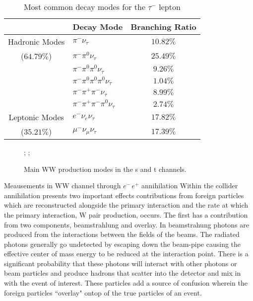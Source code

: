 \begin{table}
\centering
 \begin{tabular}{|c|l|c|} 
 
 \hline
       & Decay Mode & Branching Ratio  \\ \hline \hline
    Hadronic Modes  & $\pi^- \nu_\tau$  & $10.82\%$  \\
      	($64.79\%$) & $\pi^- \pi^0 \nu_\tau$ & $25.49\%$ \\
     				& $\pi^- \pi^0 \pi^0 \nu_\tau$  & $9.26\%$  \\
     				& $\pi^- \pi^0 \pi^0 \pi^0 \nu_\tau$  & $1.04\%$   \\
      				& $\pi^- \pi^+ \pi^- \nu_\tau$  & $8.99\%$      \\ 
      				& $\pi^- \pi^+ \pi^- \pi^0 \nu_\tau$  & $2.74\%$  \\ \hline
    			    
    Leptonic Modes  & $e^- \nu_e \nu_\tau$ & $17.82\%$   \\
    	($35.21\%$)	& $\mu^- \nu_\mu \nu_\tau $  & $17.39\%$      \\ \midrule \hline
      				
     				
\end{tabular}
        \caption{\label{tab:taudecay}Most common decay modes for the $\tau^-$ lepton \cite{pdg}}
\end{table}
       
  
   




\begin{figure}
\centering
{};
    ;
\caption{\label{fig:wwdiag} Main WW production modes in the s and t channels. }
\end{figure}

  
  Meausements in WW channel through  $e^- \, e^+$ annihilation Within the collider annihilation presents two important effects contributions from foreign particles which are reconstructed alongside the primary interaction and the rate at which the primary interaction, W pair production, occurs. The first has a contribution from two components, beamstrahlung and overlay. In beamstrahung photons are produced from the interactions between the fields of the beams. The radiated photons generally go undetected by escaping down the beam-pipe causing the effective center of mass energy to be reduced at the interaction point. There is a significant probability that these photons will interact with other photons or beam particles and produce hadrons that scatter into the detector and mix in with the event of interest. These particles add a source of confusion wherein the foreign particles ``overlay"  ontop of the true particles of an event.

